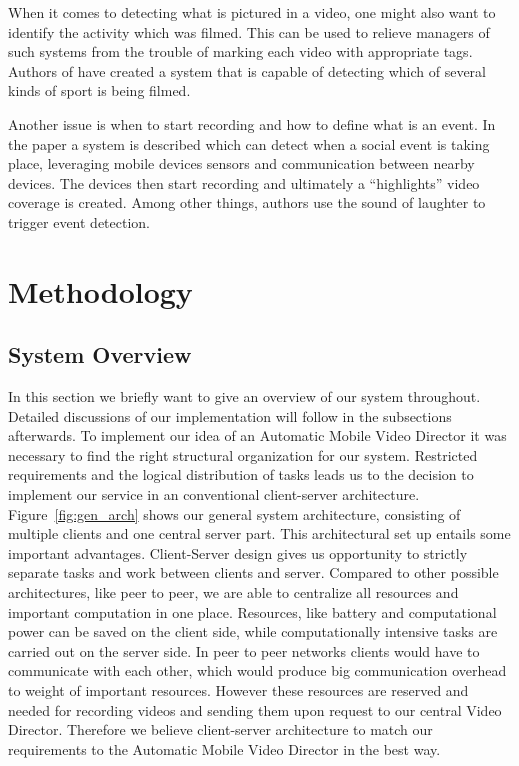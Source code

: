 \documentclass[conference]{IEEEtran}
\begin{document}
When it comes to detecting what is pictured in a video, one might also want to identify the activity which was filmed.
This can be used to relieve managers of such systems from the trouble of marking each video with appropriate tags. 
Authors of \cite{cricri_sport_2014} have created a system that is capable of detecting which of several kinds of sport is being filmed.

Another issue is when to start recording and how to define what is an event.
In the paper \cite{bao_movi:_2010} a system is described which can detect when a social event is taking place, leveraging
mobile devices sensors and communication between nearby devices.
The devices then start recording and ultimately a ``highlights'' video coverage is created.
Among other things, authors use the sound of laughter to trigger event detection.

\section{Methodology}

\subsection{System Overview}
In this section we briefly want to give an overview of our system throughout.
Detailed discussions of our implementation will follow in the subsections afterwards. 
To implement our idea of an Automatic Mobile Video Director it was necessary to find the right structural organization for our system.
Restricted requirements and the logical distribution of tasks leads us to the decision 
to implement our service in an conventional client-server architecture.
Figure~\ref{fig:gen_arch} shows our general system architecture, consisting of multiple clients and one central server part.
This architectural set up entails some important advantages.
Client-Server design gives us opportunity to strictly separate tasks and work between clients and server.
Compared to other possible architectures, like peer to peer, we are able to centralize all resources
and important computation in one place. 
Resources, like battery and computational power can be saved on the client side, 
while computationally intensive tasks are carried out on the server side. 
In peer to peer networks clients would have to communicate with each other, 
which would produce big communication overhead to weight of important resources.
However these resources are reserved and needed for recording videos and sending them upon request to our central Video Director.
Therefore we believe client-server architecture to match our requirements to the Automatic Mobile Video Director in the best way. 
\end{document}
